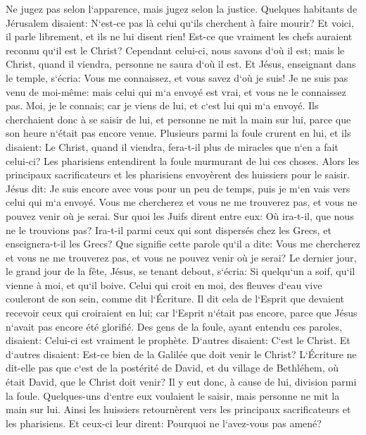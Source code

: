 \verse Ne jugez pas selon l`apparence, mais jugez selon la justice. 
\verse Quelques habitants de Jérusalem disaient: N`est-ce pas là celui qu`ils cherchent à faire mourir? 
\verse Et voici, il parle librement, et ils ne lui disent rien! Est-ce que vraiment les chefs auraient reconnu qu`il est le Christ? 
\verse Cependant celui-ci, nous savons d`où il est; mais le Christ, quand il viendra, personne ne saura d`où il est. 
\verse Et Jésus, enseignant dans le temple, s`écria: Vous me connaissez, et vous savez d`où je suis! Je ne suis pas venu de moi-même: mais celui qui m`a envoyé est vrai, et vous ne le connaissez pas. 
\verse Moi, je le connais; car je viens de lui, et c`est lui qui m`a envoyé. 
\verse Ils cherchaient donc à se saisir de lui, et personne ne mit la main sur lui, parce que son heure n`était pas encore venue. 
\verse Plusieurs parmi la foule crurent en lui, et ils disaient: Le Christ, quand il viendra, fera-t-il plus de miracles que n`en a fait celui-ci? 
\verse Les pharisiens entendirent la foule murmurant de lui ces choses. Alors les principaux sacrificateurs et les pharisiens envoyèrent des huissiers pour le saisir. 
\verse Jésus dit: Je suis encore avec vous pour un peu de temps, puis je m`en vais vers celui qui m`a envoyé. 
\verse Vous me chercherez et vous ne me trouverez pas, et vous ne pouvez venir où je serai. 
\verse Sur quoi les Juifs dirent entre eux: Où ira-t-il, que nous ne le trouvions pas? Ira-t-il parmi ceux qui sont dispersés chez les Grecs, et enseignera-t-il les Grecs? 
\verse Que signifie cette parole qu`il a dite: Vous me chercherez et vous ne me trouverez pas, et vous ne pouvez venir où je serai? 
\verse Le dernier jour, le grand jour de la fête, Jésus, se tenant debout, s`écria: Si quelqu`un a soif, qu`il vienne à moi, et qu`il boive. 
\verse Celui qui croit en moi, des fleuves d`eau vive couleront de son sein, comme dit l`Écriture. 
\verse Il dit cela de l`Esprit que devaient recevoir ceux qui croiraient en lui; car l`Esprit n`était pas encore, parce que Jésus n`avait pas encore été glorifié. 
\verse Des gens de la foule, ayant entendu ces paroles, disaient: Celui-ci est vraiment le prophète. 
\verse D`autres disaient: C`est le Christ. Et d`autres disaient: Est-ce bien de la Galilée que doit venir le Christ? 
\verse L`Écriture ne dit-elle pas que c`est de la postérité de David, et du village de Bethléhem, où était David, que le Christ doit venir? 
\verse Il y eut donc, à cause de lui, division parmi la foule. 
\verse Quelques-uns d`entre eux voulaient le saisir, mais personne ne mit la main sur lui. 
\verse Ainsi les huissiers retournèrent vers les principaux sacrificateurs et les pharisiens. Et ceux-ci leur dirent: Pourquoi ne l`avez-vous pas amené? 
